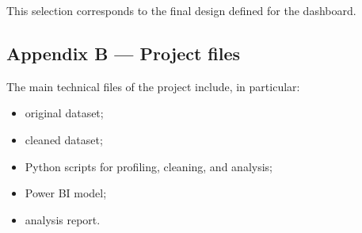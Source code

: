 \documentclass[a4paper,11pt]{article}
\begin{document}
This selection corresponds to the final design defined for the
dashboard.

\subsection{Appendix B --- Project files}

The main technical files of the project include, in particular:
\begin{itemize}
  \item original dataset;
  \item cleaned dataset;
  \item Python scripts for profiling, cleaning, and analysis;
  \item Power BI model;
  \item analysis report.
\end{itemize}
\end{document}
